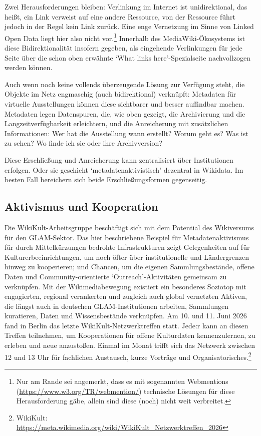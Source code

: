 \documentclass[a4paper,
fontsize=11pt,
oneside,
numbers=noperiodatend,
parskip=half-,
bibliography=totoc,
final
]{scrartcl}
\begin{document}
Zwei Herausforderungen bleiben: Verlinkung im Internet ist
unidirektional, das heißt, ein Link verweist auf eine andere Ressource,
von der Ressource führt jedoch in der Regel kein Link zurück. Eine enge
Vernetzung im Sinne von Linked Open Data liegt hier also nicht
vor.\footnote{Nur am Rande sei angemerkt, dass es mit sogenannten
  Webmentions (\url{https://www.w3.org/TR/webmention/}) technische
  Lösungen für diese Herausforderung gäbe, allein sind diese (noch)
  nicht weit verbreitet.} Innerhalb des MediaWiki-Ökosystems ist diese
Bidirektionalität insofern gegeben, als eingehende Verlinkungen für jede
Seite über die schon oben erwähnte \enquote*{What links
here}-Spezialseite nachvollzogen werden können.

Auch wenn noch keine vollends überzeugende Lösung zur Verfügung steht,
die Objekte im Netz engmaschig (auch bidirektional) verknüpft: Metadaten
für virtuelle Ausstellungen können diese sichtbarer und besser
auffindbar machen. Metadaten legen Datenspuren, die, wie oben gezeigt,
die Archivierung und die Langzeitverfügbarkeit erleichtern, und die
Anreicherung mit zusätzlichen Informationen: Wer hat die Ausstellung
wann erstellt? Worum geht es? Was ist zu sehen? Wo finde ich sie oder
ihre Archivversion?

Diese Erschließung und Anreicherung kann zentralisiert über
Institutionen erfolgen. Oder sie geschieht
\enquote*{metadatenaktivistisch} dezentral in Wikidata. Im besten Fall
bereichern sich beide Erschließungsformen gegenseitig.

\hypertarget{aktivismus-und-kooperation}{%
\subsection{Aktivismus und
Kooperation}\label{aktivismus-und-kooperation}}

Die WikiKult-Arbeitsgruppe beschäftigt sich mit dem Potential des
Wikiversums für den GLAM-Sektor. Das hier beschriebene Beispiel für
Metadatenaktivismus für durch Mittelkürzungen bedrohte Infrastrukturen
zeigt Gelegenheiten auf für Kulturerbeeinrichtungen, um noch öfter über
institutionelle und Ländergrenzen hinweg zu kooperieren; und Chancen, um
die eigenen Sammlungsbestände, offene Daten und Community-orientierte
\enquote*{Outreach}-Aktivitäten gemeinsam zu verknüpfen. Mit der
Wikimediabewegung existiert ein besonderes Soziotop mit engagierten,
regional verankerten und zugleich auch global vernetzten Aktiven, die
längst auch in deutschen GLAM-Institutionen arbeiten, Sammlungen
kuratieren, Daten und Wissensbestände verknüpfen. Am 10. und 11. Juni
2026 fand in Berlin das letzte WikiKult-Netzwerktreffen statt. Jede:r
kann an diesen Treffen teilnehmen, um Kooperationen für offene
Kulturdaten kennenzulernen, zu erleben und neue anzustoßen. Einmal im
Monat trifft sich das Netzwerk zwischen 12 und 13 Uhr für fachlichen
Austausch, kurze Vorträge und Organisatorisches.\footnote{WikiKult:
  \url{https://meta.wikimedia.org/wiki/WikiKult_Netzwerktreffen_2026}}
\end{document}
